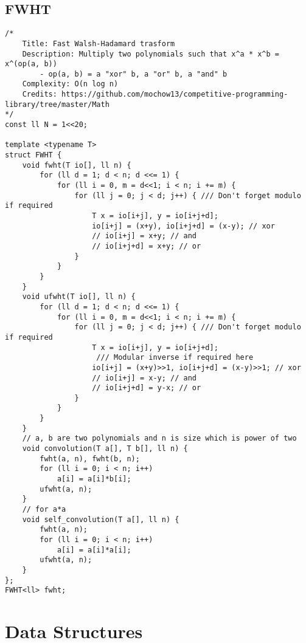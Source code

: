 \documentclass{article}
\begin{document}
\subsection{FWHT}
\begin{verbatim}
/*
	Title: Fast Walsh-Hadamard trasform
	Description: Multiply two polynomials such that x^a * x^b = x^(op(a, b))
		- op(a, b) = a "xor" b, a "or" b, a "and" b
	Complexity: O(n log n)
	Credits: https://github.com/mochow13/competitive-programming-library/tree/master/Math
*/
const ll N = 1<<20;

template <typename T>
struct FWHT {
	void fwht(T io[], ll n) {
		for (ll d = 1; d < n; d <<= 1) {
			for (ll i = 0, m = d<<1; i < n; i += m) {
				for (ll j = 0; j < d; j++) { /// Don't forget modulo if required
					T x = io[i+j], y = io[i+j+d];
					io[i+j] = (x+y), io[i+j+d] = (x-y);	// xor
					// io[i+j] = x+y; // and
					// io[i+j+d] = x+y; // or
				}
			}
		}
	}
	void ufwht(T io[], ll n) {
		for (ll d = 1; d < n; d <<= 1) {
			for (ll i = 0, m = d<<1; i < n; i += m) {
				for (ll j = 0; j < d; j++) { /// Don't forget modulo if required
					T x = io[i+j], y = io[i+j+d];
					 /// Modular inverse if required here
					io[i+j] = (x+y)>>1, io[i+j+d] = (x-y)>>1; // xor
					// io[i+j] = x-y; // and
					// io[i+j+d] = y-x; // or
				}
			}
		}
	}
	// a, b are two polynomials and n is size which is power of two
	void convolution(T a[], T b[], ll n) {
		fwht(a, n), fwht(b, n);
		for (ll i = 0; i < n; i++)
			a[i] = a[i]*b[i];
		ufwht(a, n);
	}
	// for a*a	
	void self_convolution(T a[], ll n) {
		fwht(a, n);
		for (ll i = 0; i < n; i++)
			a[i] = a[i]*a[i];
		ufwht(a, n);
	}
};
FWHT<ll> fwht;
\end{verbatim}
\section{Data Structures}
\end{document}
